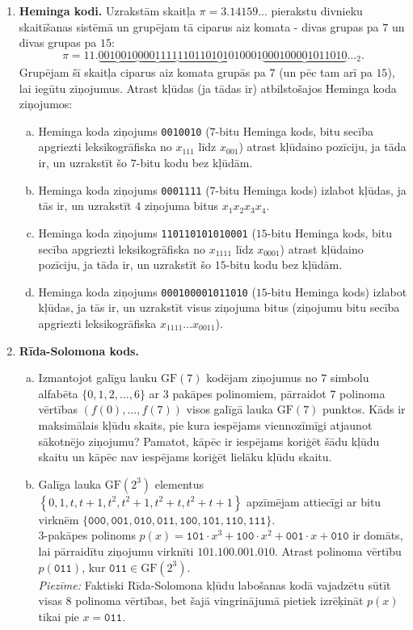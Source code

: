 \documentclass[a4paper]{article}
\begin{document}
\begin{enumerate}
\item {\bf Heminga kodi.} 
Uzrakstām skaitļa $\pi = 3.14159\ldots$ pierakstu divnieku skaitīšanas sistēmā un 
grupējam tā ciparus aiz komata - divas grupas pa $7$ un divas grupas pa $15$:
$$\pi = 11.\underbrace{0010010}\underbrace{0001111}\underbrace{110110101010001}\underbrace{000100001011010}\ldots_2.$$
Grupējam šī skaitļa ciparus aiz komata grupās pa $7$ (un pēc tam arī pa
$15$), lai iegūtu ziņojumus. Atrast kļūdas (ja tādas ir) atbilstošajos Heminga koda ziņojumos:
\begin{enumerate}[(a)]
\item Heminga koda ziņojums {\tt 0010010} ($7$-bitu Heminga kods, bitu secība apgriezti leksikogrāfiska
\textendash{} no $x_{111}$ līdz $x_{001}$) \textendash{} atrast kļūdaino pozīciju, ja tāda ir, un uzrakstīt šo $7$-bitu kodu bez kļūdām.
\item Heminga koda ziņojums {\tt 0001111} ($7$-bitu Heminga kods) \textendash{} izlabot kļūdas, ja tās ir, un uzrakstīt $4$ ziņojuma bitus $x_1x_2x_3x_4$. 
\item Heminga koda ziņojums {\tt 110110101010001} ($15$-bitu Heminga kods, bitu secība apgriezti leksikogrāfiska 
\textendash{} no $x_{1111}$ līdz $x_{0001}$) \textendash{} atrast kļūdaino pozīciju, ja tāda ir, un uzrakstīt šo $15$-bitu kodu bez kļūdām.
\item Heminga koda ziņojums {\tt 000100001011010} ($15$-bitu Heminga kods) \textendash{} 
izlabot kļūdas, ja tās ir, un uzrakstīt visus ziņojuma bitus (ziņojumu bitu secība apgriezti leksikogrāfiska $x_{1111}\ldots{}x_{0011}$).
\end{enumerate}

\item {\bf Rīda-Solomona kods.} 
\begin{enumerate}[(a)]
\item Izmantojot galīgu lauku $\text{GF}(7)$ kodējam ziņojumus no 
$7$ simbolu alfabēta $\{ 0,1,2,\ldots,6 \}$ ar $3$ pakāpes polinomiem, 
pārraidot $7$ polinoma vērtības $(f(0),\ldots,f(7))$ visos
galīgā lauka $\text{GF}(7)$ punktos. 
Kāds ir maksimālais kļūdu skaits, pie kura iespējams 
viennozīmīgi atjaunot sākotnējo ziņojumu?
Pamatot, kāpēc ir iespējams koriģēt šādu kļūdu skaitu un kāpēc nav
iespējams koriģēt lielāku kļūdu skaitu.
\item Galīga lauka $\text{GF}(2^3)$ elementus $\left\{ 0,1,t,t+1,t^2,t^2+1,t^2+t,t^2+t+1 \right\}$
apzīmējam attiecīgi ar bitu virknēm $\{\mathtt{000},\mathtt{001},\mathtt{010},\mathtt{011},
\mathtt{100},\mathtt{101},\mathtt{110},\mathtt{111}\}$.\\
$3$-pakāpes polinoms $p(x) = \mathtt{101}\cdot{}x^3 + \mathtt{100}\cdot{}x^2 + \mathtt{001}\cdot{}x + \mathtt{010}$
ir domāts, lai pārraidītu ziņojumu virknīti $\mathtt{101.100.001.010}$. 
Atrast polinoma vērtību $p(\mathtt{011})$, kur $\mathtt{011}\in\text{GF}(2^3)$.\\
{\em Piezīme:} Faktiski Rīda-Solomona kļūdu labošanas kodā vajadzētu sūtīt 
visas $8$ polinoma vērtības, bet šajā vingrinājumā pietiek izrēķināt $p(x)$ tikai pie $x=\mathtt{011}$. 
\end{enumerate}


\end{enumerate}
\end{document}
